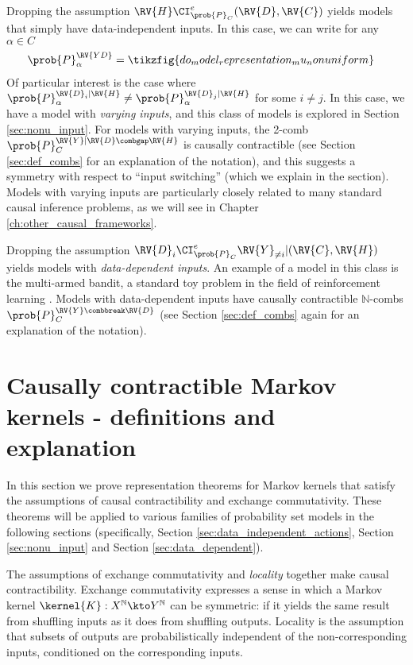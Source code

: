 Dropping the assumption $\RV{H}\CI^e_{\prob{P}_C} (\RV{D},\RV{C})$ yields models that simply have data-independent inputs. In this case, we can write for any $\alpha\in C$
\begin{align}
    \prob{P}_\alpha^{\RV{YD}} &= \tikzfig{do_model_representation_mu_nonuniform}
\end{align}
Of particular interest is the case where $\prob{P}_\alpha^{\RV{D}_i|\RV{H}}\neq \prob{P}_\alpha^{\RV{D}_j|\RV{H}}$ for some $i\neq j$. In this case, we have a model with \emph{varying inputs}, and this class of models is explored in Section \ref{sec:nonu_input}. For models with varying inputs, the 2-comb $\prob{P}_C^{\RV{Y}|\RV{D}\combgap \RV{H}}$ is causally contractible (see Section \ref{sec:def_combs} for an explanation of the notation), and this suggests a symmetry with respect to ``input switching'' (which we explain in the section). Models with varying inputs are particularly closely related to many standard causal inference problems, as we will see in Chapter \ref{ch:other_causal_frameworks}.

Dropping the assumption $\RV{D}_i \CI^e_{\prob{P}_C} \RV{Y}_{\neq i}|(\RV{C},\RV{H})$ yields models with \emph{data-dependent inputs}. An example of a model in this class is the multi-armed bandit, a standard toy problem in the field of reinforcement learning \citet{barto_reinforcement_1998}. Models with data-dependent inputs have causally contractible $\mathbb{N}$-combs $\prob{P}_C^{\RV{Y}\combbreak \RV{D}}$ (see Section \ref{sec:def_combs} again for an explanation of the notation).

\section[Causally contractible Markov kernels]{Causally contractible Markov kernels - definitions and explanation}\label{sec:ccontracibility}

In this section we prove representation theorems for Markov kernels that satisfy the assumptions of causal contractibility and exchange commutativity. These theorems will be applied to various families of probability set models in the following sections (specifically, Section \ref{sec:data_independent_actions}, Section \ref{sec:nonu_input} and Section \ref{sec:data_dependent}).

The assumptions of exchange commutativity and \emph{locality} together make causal contractibility. Exchange commutativity expresses a sense in which a Markov kernel $\kernel{K}:X^{\mathbb{N}}\kto Y^{\mathbb{N}}$ can be symmetric: if it yields the same result from shuffling inputs as it does from shuffling outputs. Locality is the assumption that subsets of outputs are probabilistically independent of the non-corresponding inputs, conditioned on the corresponding inputs.

